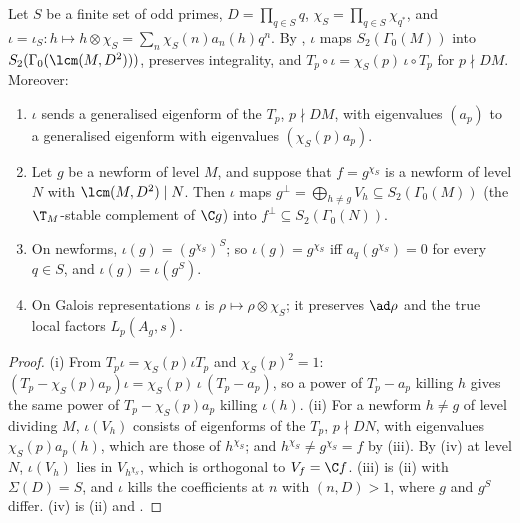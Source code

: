 \begin{proposition}\label{prop:modgalrep:twist-map}
Let $S$ be a finite set of odd primes, $D=\prod_{q\in S}q$, $\chi_S=\prod_{q\in S}\chi_{q^*}$, and $\iota=\iota_S\colon h\mapsto h\otimes\chi_S=\sum_n\chi_S(n)a_n(h)q^n$. By , $\iota$
maps $S_2(\Gamma_0(M))$ into $S_2(\Gamma_0(\lcm(M,D^2)))$, preserves integrality, and $T_p\circ\iota=\chi_S(p)\,\iota\circ T_p$ for $p\nmid DM$. Moreover:
\begin{enumerate}[label=(\roman*)]
\item $\iota$ sends a generalised eigenform of the $T_p$, $p\nmid DM$, with eigenvalues $(a_p)$ to a generalised eigenform with eigenvalues $(\chi_S(p)a_p)$.
\item Let $g$ be a newform of level $M$, and suppose that $f=g^{\chi_S}$ is a newform of level $N$ with $\lcm(M,D^2)\mid N$. Then $\iota$ maps $g^\perp=\bigoplus_{h\ne g}V_h\subseteq S_2(\Gamma_0(M))$
(the $\T_M$-stable complement of $\C g$) into $f^\perp\subseteq S_2(\Gamma_0(N))$.
\item On newforms, $\iota(g)=(g^{\chi_S})^S$; so $\iota(g)=g^{\chi_S}$ iff $a_q(g^{\chi_S})=0$ for every $q\in S$, and $\iota(g)=\iota(g^S)$.
\item On Galois representations $\iota$ is $\rho\mapsto\rho\otimes\chi_S$; it preserves $\ad\rho$ and the true local factors $L_p(A_g,s)$.
\end{enumerate}
\end{proposition}

\begin{proof}
(i) From $T_p\iota=\chi_S(p)\iota T_p$ and $\chi_S(p)^2=1$: $(T_p-\chi_S(p)a_p)\iota=\chi_S(p)\,\iota\,(T_p-a_p)$, so a power of $T_p-a_p$ killing $h$ gives the same power of $T_p-\chi_S(p)a_p$
killing $\iota(h)$. (ii) For a newform $h\ne g$ of level dividing $M$, $\iota(V_h)$ consists of eigenforms of the $T_p$, $p\nmid DN$, with eigenvalues $\chi_S(p)a_p(h)$, which are
those of $h^{\chi_S}$; and $h^{\chi_S}\ne g^{\chi_S}=f$ by (iii). By (iv) at level $N$, $\iota(V_h)$ lies in $V_{h^{\chi_S}}$, which is
orthogonal to $V_f=\C f$. (iii) is (ii) with $\Sigma(D)=S$, and $\iota$ kills the coefficients at $n$ with $(n,D)>1$, where $g$ and $g^S$ differ. (iv) is
(ii) and .
\end{proof}

